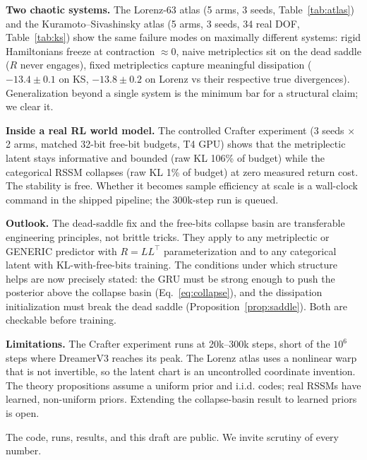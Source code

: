 \documentclass[preprint,12pt]{article}
\begin{document}
\textbf{Two chaotic systems.} The Lorenz-63 atlas (5 arms, 3 seeds,
Table~\ref{tab:atlas}) and the Kuramoto--Sivashinsky atlas (5 arms,
3 seeds, 34 real DOF, Table~\ref{tab:ks}) show the same failure modes
on maximally different systems: rigid Hamiltonians freeze at
contraction $\approx 0$, naive metriplectics sit on the dead saddle
($R$ never engages), fixed metriplectics capture meaningful dissipation
($-13.4\pm0.1$ on KS, $-13.8\pm0.2$ on Lorenz vs their respective
true divergences). Generalization beyond a single system is the minimum
bar for a structural claim; we clear it.

\textbf{Inside a real RL world model.} The controlled Crafter experiment
(3 seeds $\times$ 2 arms, matched 32-bit free-bit budgets, T4 GPU) shows
that the metriplectic latent stays informative and bounded (raw KL 106\%
of budget) while the categorical RSSM collapses (raw KL 1\% of budget) at
zero measured return cost. The stability is free. Whether it becomes
sample efficiency at scale is a wall-clock command in the shipped pipeline;
the 300k-step run is queued.

\textbf{Outlook.} The dead-saddle fix and the free-bits collapse basin
are transferable engineering principles, not brittle tricks. They apply to
any metriplectic or GENERIC predictor with $R = LL^\top$ parameterization
and to any categorical latent with KL-with-free-bits training. The
conditions under which structure helps are now precisely stated: the GRU
must be strong enough to push the posterior above the collapse basin
(Eq.~\eqref{eq:collapse}), and the dissipation initialization must break
the dead saddle (Proposition~\ref{prop:saddle}). Both are checkable
before training.

\textbf{Limitations.} The Crafter experiment runs at 20k--300k steps,
short of the $10^6$ steps where DreamerV3 reaches its peak. The Lorenz
atlas uses a nonlinear warp that is not invertible, so the latent chart
is an uncontrolled coordinate invention. The theory propositions assume a
uniform prior and i.i.d. codes; real RSSMs have learned, non-uniform
priors. Extending the collapse-basin result to learned priors is open.

The code, runs, results, and this draft are public. We invite scrutiny of
every number.
\end{document}
